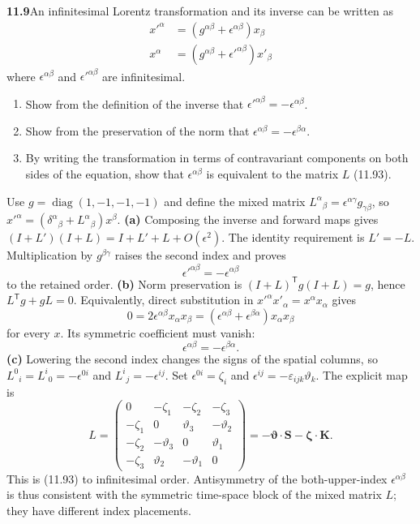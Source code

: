 \par\bigskip
\noindent\textbf{11.9}\quad An infinitesimal Lorentz transformation and its inverse can be written as
\begin{align*}
x'^{\alpha}&=(g^{\alpha\beta}+\epsilon^{\alpha\beta})x_{\beta}\\
x^{\alpha}&=(g^{\alpha\beta}+\epsilon'^{\alpha\beta})x'_{\beta}
\end{align*}
where $\epsilon^{\alpha\beta}$ and $\epsilon'^{\alpha\beta}$ are infinitesimal.
\begin{enumerate}
\item[(a)] Show from the definition of the inverse that $\epsilon'^{\alpha\beta}=-\epsilon^{\alpha\beta}$.
\item[(b)] Show from the preservation of the norm that $\epsilon^{\alpha\beta}=-\epsilon^{\beta\alpha}$.
\item[(c)] By writing the transformation in terms of contravariant components on both sides of the equation, show that $\epsilon^{\alpha\beta}$ is equivalent to the matrix $L$ (11.93).
\end{enumerate}
\solution
Use $g=\operatorname{diag}(1,-1,-1,-1)$ and define the mixed
matrix $L^\alpha{}_{\beta}=\epsilon^{\alpha\gamma}g_{\gamma\beta}$,
so $x'^\alpha=(\delta^\alpha{}_{\beta}+L^\alpha{}_{\beta})x^\beta$.
\textbf{(a)} Composing the inverse and forward maps gives
$(I+L')(I+L)=I+L'+L+O(\epsilon^2)$. The identity requirement is
$L'=-L$. Multiplication by $g^{\beta\gamma}$ raises the second
index and proves
\[
\boxed{\epsilon'^{\alpha\beta}=-\epsilon^{\alpha\beta}}
\]
to the retained order.
\textbf{(b)} Norm preservation is
$(I+L)^{\mathsf T}g(I+L)=g$, hence
$L^{\mathsf T}g+gL=0$. Equivalently, direct substitution in
$x'^\alpha x'_\alpha=x^\alpha x_\alpha$ gives
\[
0=2\epsilon^{\alpha\beta}x_\alpha x_\beta
=(\epsilon^{\alpha\beta}+\epsilon^{\beta\alpha})x_\alpha x_\beta
\]
for every $x$. Its symmetric coefficient must vanish:
\[
\boxed{\epsilon^{\alpha\beta}=-\epsilon^{\beta\alpha}.}
\]
\textbf{(c)} Lowering the second index changes the signs of the
spatial columns, so $L^{0}{}_{i}=L^{i}{}_{0}=-\epsilon^{0i}$ and
$L^i{}_j=-\epsilon^{ij}$. Set
$\epsilon^{0i}=\zeta_i$ and
$\epsilon^{ij}=-\varepsilon_{ijk}\vartheta_k$. The explicit map is
\[
L=\begin{pmatrix}
0&-\zeta_1&-\zeta_2&-\zeta_3\\
-\zeta_1&0&\vartheta_3&-\vartheta_2\\
-\zeta_2&-\vartheta_3&0&\vartheta_1\\
-\zeta_3&\vartheta_2&-\vartheta_1&0
\end{pmatrix}
=\boxed{-\boldsymbol\vartheta\cdot\mathbf S
-\boldsymbol\zeta\cdot\mathbf K.}
\]
This is (11.93) to infinitesimal order. Antisymmetry of the
both-upper-index $\epsilon^{\alpha\beta}$ is thus consistent with
the symmetric time-space block of the mixed matrix $L$; they have
different index placements.

